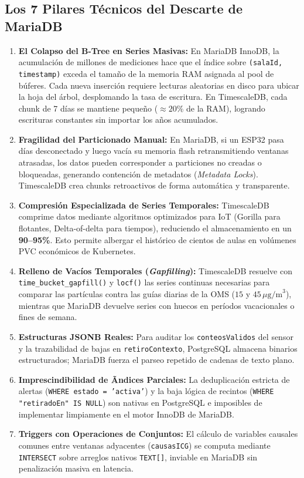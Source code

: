 \documentclass[11pt,a4paper]{article}
\begin{document}
\subsection{Los 7 Pilares Técnicos del Descarte de MariaDB}
\begin{enumerate}
    \item \textbf{El Colapso del B-Tree en Series Masivas:} En MariaDB InnoDB, la acumulación de millones de mediciones hace que el índice sobre \texttt{(salaId, timestamp)} exceda el tamaño de la memoria RAM asignada al pool de búferes. Cada nueva inserción requiere lecturas aleatorias en disco para ubicar la hoja del árbol, desplomando la tasa de escritura. En TimescaleDB, cada chunk de 7 días se mantiene pequeño ($\approx 20\%$ de la RAM), logrando escrituras constantes sin importar los años acumulados.
    \item \textbf{Fragilidad del Particionado Manual:} En MariaDB, si un ESP32 pasa días desconectado y luego vacía su memoria flash retransmitiendo ventanas atrasadas, los datos pueden corresponder a particiones no creadas o bloqueadas, generando contención de metadatos (\textit{Metadata Locks}). TimescaleDB crea chunks retroactivos de forma automática y transparente.
    \item \textbf{Compresión Especializada de Series Temporales:} TimescaleDB comprime datos mediante algoritmos optimizados para IoT (Gorilla para flotantes, Delta-of-delta para tiempos), reduciendo el almacenamiento en un \textbf{90--95\%}. Esto permite albergar el histórico de cientos de aulas en volúmenes PVC económicos de Kubernetes.
    \item \textbf{Relleno de Vacíos Temporales (\textit{Gapfilling}):} TimescaleDB resuelve con \texttt{time\_bucket\_gapfill()} y \texttt{locf()} las series continuas necesarias para comparar las partículas contra las guías diarias de la OMS ($15$ y $45\,\mu\text{g/m}^3$), mientras que MariaDB devuelve series con huecos en períodos vacacionales o fines de semana.
    \item \textbf{Estructuras JSONB Reales:} Para auditar los \texttt{conteosValidos} del sensor y la trazabilidad de bajas en \texttt{retiroContexto}, PostgreSQL almacena binarios estructurados; MariaDB fuerza el parseo repetido de cadenas de texto plano.
    \item \textbf{Imprescindibilidad de Ãndices Parciales:} La deduplicación estricta de alertas (\texttt{WHERE estado = 'activa'}) y la baja lógica de recintos (\texttt{WHERE "retiradoEn" IS NULL}) son nativas en PostgreSQL e imposibles de implementar limpiamente en el motor InnoDB de MariaDB.
    \item \textbf{Triggers con Operaciones de Conjuntos:} El cálculo de variables causales comunes entre ventanas adyacentes (\texttt{causasICG}) se computa mediante \texttt{INTERSECT} sobre arreglos nativos \texttt{TEXT[]}, inviable en MariaDB sin penalización masiva en latencia.
\end{enumerate}
\end{document}
